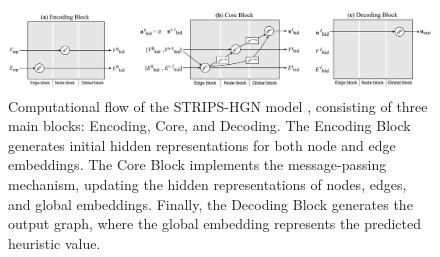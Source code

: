 \begin{figure}[t]
    \centering
    \includegraphics[width=1.0\textwidth]{figures/images/ch4/computational_flow.jpg}
    \caption{Computational flow of the STRIPS-HGN model \cite{shen2020learning}, consisting of three main blocks: Encoding, Core, and Decoding. The Encoding Block generates initial hidden representations for both node and edge embeddings. The Core Block implements the message-passing mechanism, updating the hidden representations of nodes, edges, and global embeddings. Finally, the Decoding Block generates the output graph, where the global embedding represents the predicted heuristic value.}
    \label{fig:computation_flow}
\end{figure}
